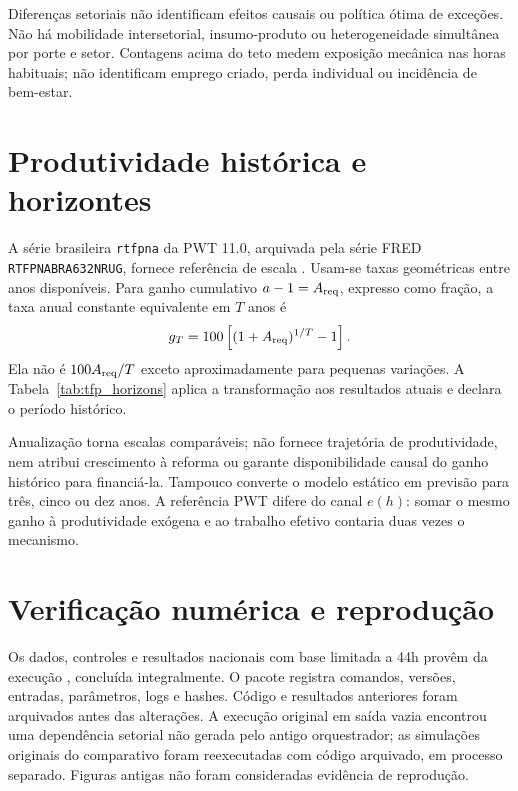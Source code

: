 Diferenças setoriais não identificam efeitos causais ou política ótima de exceções. Não há mobilidade intersetorial, insumo-produto ou heterogeneidade simultânea por porte e setor. Contagens acima do teto medem exposição mecânica nas horas habituais; não identificam emprego criado, perda individual ou incidência de bem-estar.

\FloatBarrier
\section{Produtividade histórica e horizontes}\label{app:tfp_history_table}
A série brasileira \texttt{rtfpna} da PWT 11.0, arquivada pela série FRED \texttt{RTFPNABRA632NRUG}, fornece referência de escala \citep{PWT2025,FREDPWTBrazil2026}. Usam-se taxas geométricas entre anos disponíveis. Para ganho cumulativo $a-1=A_{\mathrm{req}}$, expresso como fração, a taxa anual constante equivalente em $T$ anos é
\begin{equation}\label{eq:app_annualized}
g_T=100\left[(1+A_{\mathrm{req}})^{1/T}-1\right].
\end{equation}
Ela não é $100A_{\mathrm{req}}/T$ exceto aproximadamente para pequenas variações. A Tabela~\ref{tab:tfp_horizons} aplica a transformação aos resultados atuais e declara o período histórico.


Anualização torna escalas comparáveis; não fornece trajetória de produtividade, nem atribui crescimento à reforma ou garante disponibilidade causal do ganho histórico para financiá-la. Tampouco converte o modelo estático em previsão para três, cinco ou dez anos. A referência PWT difere do canal $e(h)$: somar o mesmo ganho à produtividade exógena e ao trabalho efetivo contaria duas vezes o mecanismo.

\FloatBarrier
\section{Verificação numérica e reprodução}\label{app:replication}
Os dados, controles e resultados nacionais com base limitada a 44h provêm da execução , concluída integralmente. O pacote registra comandos, versões, entradas, parâmetros, logs e hashes. Código e resultados anteriores foram arquivados antes das alterações. A execução original em saída vazia encontrou uma dependência setorial não gerada pelo antigo orquestrador; as simulações originais do comparativo foram reexecutadas com código arquivado, em processo separado. Figuras antigas não foram consideradas evidência de reprodução.

